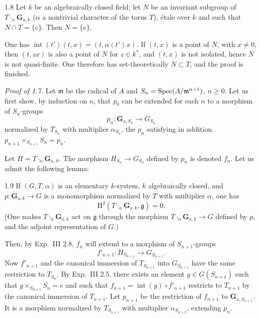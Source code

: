\begin{lemma}{1.8}\label{XX.1.8}
Let $k$ be an algebraically closed field; let $N$ be an invariant subgroup of $T\cdot_\alpha\mathbf G_{\mathrm a,k}$ ($\alpha$ a nontrivial character of the torus $T$), \'etale over $k$ and such that $N\cap T=\{e\}$. Then $N=\{e\}$.
\end{lemma}
One has $\operatorname{int}(t')(t,x)=(t,\alpha(t')x)$. If $(t,x)$ is a point of $N$, with $x\ne0$, then $(t,zx)$ is also a point of $N$ for $z\in k^*$, and $(t,x)$ is not isolated, hence $N$ is not quasi-finite. One therefore has set-theoretically $N\subset T$, and the proof is finished.

\emph{Proof of 1.7.} Let $\mathfrak m$ be the radical of $A$ and $S_n=\operatorname{Spec}(A/\mathfrak m^{n+1})$, $n\geq0$. Let us first show, by induction on $n$, that $p_0$ can be extended for each $n$ to a morphism of $S_n$-groups
\[
p_n:\mathbf G_{\mathrm a,S_n}\to G_{S_n}
\]
normalized by $T_{S_n}$ with multiplier $\alpha_{S_n}$, the $p_n$ satisfying in addition $p_{n+1}\times_{S_{n+1}}S_n=p_n$.

Let $H=T\cdot_\alpha\mathbf G_{\mathrm a,S}$. The morphism $H_{S_n}\to G_{S_n}$ defined by $p_n$ is denoted $f_n$. Let us admit the following lemma:

\begin{lemma}{1.9}\label{XX.1.9}
If $(G,T,\alpha)$ is an elementary $k$-system, $k$ algebraically closed, and $p:\mathbf G_{\mathrm a,k}\to G$ is a monomorphism normalized by $T$ with multiplier $\alpha$, one has
\[
\mathrm H^2(T\cdot_\alpha\mathbf G_{\mathrm a,k},\mathfrak g)=0.
\]
(One makes $T\cdot_\alpha\mathbf G_{\mathrm a,k}$ act on $\mathfrak g$ through the morphism $T\cdot_\alpha\mathbf G_{\mathrm a,k}\to G$ defined by $p$, and the adjoint representation of $G$.)
\end{lemma}
Then, by Exp.~III 2.8, $f_n$ will extend to a morphism of $S_{n+1}$-groups
\[
f'_{n+1}:H_{S_{n+1}}\to G_{S_{n+1}}.
\]
Now $f'_{n+1}$ and the canonical immersion of $T_{S_{n+1}}$ into $G_{S_{n+1}}$ have the same restriction to $T_{S_n}$. By Exp.~III 2.5, there exists an element $g\in G(S_{n+1})$ such that $g\times_{S_{n+1}}S_n=e$ and such that $f_{n+1}=\operatorname{int}(g)\circ f'_{n+1}$ restricts to $T_{n+1}$ by the canonical immersion of $T_{n+1}$. Let $p_{n+1}$ be the restriction of $f_{n+1}$ to $\mathbf G_{\mathrm a,S_{n+1}}$. It is a morphism normalized by $T_{S_{n+1}}$ with multiplier $\alpha_{S_{n+1}}$, extending $p_n$.

